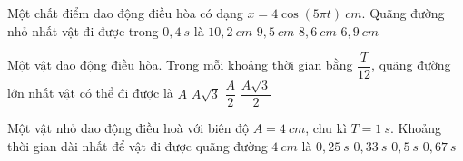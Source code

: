 \begin{ex}
Một chất điểm dao động điều hòa có dạng $x = 4\cos(5\pi t)\ cm$. Quãng đường nhỏ nhất vật đi được trong $0,4\ s$ là
\choice
{$10,2\ cm$}
{$9,5\ cm$}
{$8,6\ cm$}
{\True $6,9\ cm$}
\end{ex}
\begin{ex}
Một vật dao động điều hòa. Trong mỗi khoảng thời gian bằng $\dfrac{T}{12}$, quãng đường lớn nhất vật có thể đi được là
\choice
{$A$}
{\True $A\sqrt{3}$}
{$\dfrac{A}{2}$}
{$\dfrac{A\sqrt{3}}{2}$}
\end{ex}
\begin{ex}
Một vật nhỏ dao động điều hoà với biên độ $A = 4\ cm$, chu kì $T = 1\ s$. Khoảng thời gian dài nhất để vật đi được quãng đường $4\ cm$ là
\choice
{$0,25\ s$}
{$0,33\ s$}
{\True $0,5\ s$}
{$0,67\ s$}
\end{ex}

